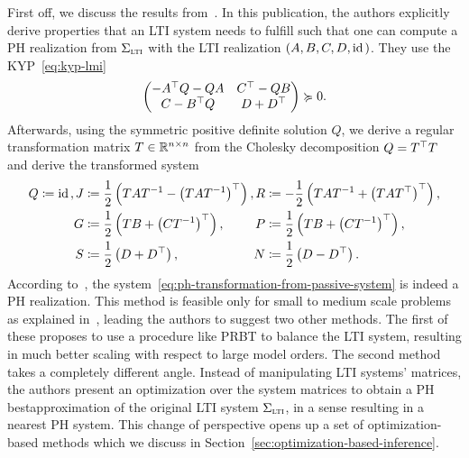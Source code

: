 First off, we discuss the results from~\cite{Beattie2022}.
In this publication, the authors explicitly derive properties that an \ac{LTI} system needs to fulfill such that one can compute a \ac{PH} realization from $\Sigma_{\textnormal{\scshape lti}}$ with the \ac{LTI} realization $(A, B, C, D, \text{id}_{\mkern2mu })$.
They use the \ac{KYP}~\eqref{eq:kyp-lmi}
\begin{equation*}
    \begin{pmatrix}
        - A^{\top} Q - Q A & C^{\top} - QB \\
        C - B^{\top} Q & D + D^{\top}
    \end{pmatrix} \succcurlyeq 0.
\end{equation*}
Afterwards, using the symmetric positive definite solution $Q$, we derive a regular transformation matrix $T \in \mathbb{R}^{n \times n}$ from the Cholesky decomposition $Q = T^{\top} T$ and derive the transformed system
\begin{equation}\label{eq:ph-transformation-from-passive-system}
    \begin{alignedat}{8}
        Q &\coloneqq \id, &J &\coloneqq \frac{1}{2} \left( T A T\inv - {\left( T A T\inv \right)}\trans \right), &R &\coloneqq -\frac{1}{2} \left( T A T\inv + {\left( T A T\trans \right)}\trans \right), \\
        & &G &\coloneqq \frac{1}{2} \left( T B + {\left( C T\inv \right)}\trans \right), &P &\coloneqq \frac{1}{2} \left( T B + {\left( C T\inv \right)}\trans \right), \\
        & &S &\coloneqq \frac{1}{2} \left( D + D\trans \right), &N &\coloneqq \frac{1}{2} \left( D - D\trans \right).
    \end{alignedat}
\end{equation}
According to~\cite{Beattie2011}, the system~\eqref{eq:ph-transformation-from-passive-system} is indeed a \ac{PH} realization.
This method is feasible only for small to medium scale problems as explained in~\cite{Cherifi2019}, leading the authors to suggest two other methods.
The first of these proposes to use a procedure like \ac{PRBT} to balance the \ac{LTI} system, resulting in much better scaling with respect to large model orders.
The second method takes a completely different angle.
Instead of manipulating \ac{LTI} systems' matrices, the authors present an optimization over the system matrices to obtain a \ac{PH} bestapproximation of the original \ac{LTI} system $\Sigma_{\textnormal{\scshape lti}}$, in a sense resulting in a nearest \ac{PH} system.
This change of perspective opens up a set of optimization-based methods which we discuss in Section~\ref{sec:optimization-based-inference}.
